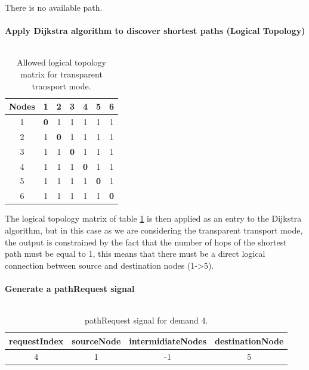 There is no available path.\\ \\

\textbf{Apply Dijkstra algorithm to discover shortest paths (Logical Topology)}\\ \\
\begin{table}[H]
	\centering	
	\begin{tabular}{|c|c|c|c|c|c|c|}
		\hline
		\multicolumn{1}{|l|}{\textbf{Nodes}} & 1   & 2   & 3   & 4   & 5   & 6  \\ \hline
		1                           & \textbf{0}   & 1 & 1 & 1 & 1 & 1 \\ \hline
		2                           & 1 & \textbf{0}   & 1 & 1 & 1 & 1 \\ \hline
		3                           & 1 & 1 & \textbf{0}   & 1 & 1 & 1 \\ \hline
		4                           & 1 & 1 & 1 & \textbf{0}   & 1 & 1 \\ \hline
		5                           & 1 & 1 & 1 & 1 & \textbf{0}   & 1 \\ \hline
		6                           & 1 & 1 & 1 & 1 & 1 & \textbf{0}   \\ \hline
	\end{tabular}
	\caption{Allowed logical topology matrix for transparent transport mode.}
	\label{Transparentlogical_topology}
\end{table}

The logical topology matrix of table \ref{Transparentlogical_topology} is then applied as an entry to the Dijkstra algorithm, but in this case as we are considering the transparent transport mode, the output is constrained by the fact that the number of hops of the shortest path must be equal to 1, this means that there must be a direct logical connection between source and destination nodes (1->5).\\ \\

\textbf{Generate a pathRequest signal}\\ \\

\begin{table}[H]
	\centering
	\begin{tabular}{|c|c|c|c|}
		\hline
		requestIndex & sourceNode & intermidiateNodes & destinationNode \\ \hline
		4            & 1          & -1                 & 5               \\ \hline
	\end{tabular}
	\caption{pathRequest signal for demand 4.}
\end{table} 

